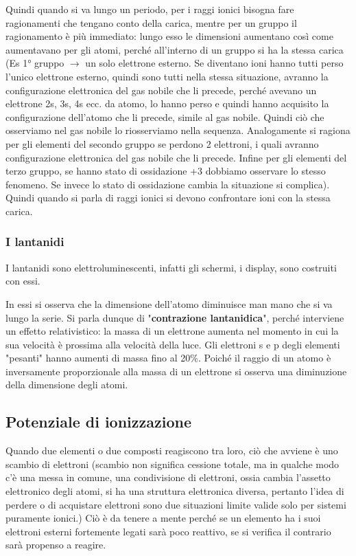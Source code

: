 
Quindi quando si va lungo un periodo, per i raggi ionici bisogna fare ragionamenti che tengano conto della carica, mentre per un gruppo il ragionamento è più immediato: lungo esso le dimensioni aumentano così come aumentavano per gli atomi, perché all'interno di un gruppo si ha la stessa carica (Es 1° gruppo $\rightarrow$ un solo elettrone esterno. Se diventano ioni hanno tutti perso l'unico elettrone esterno, quindi sono tutti nella stessa situazione, avranno la configurazione elettronica del gas nobile che li precede, perché avevano un elettrone 2s, 3s, 4s ecc. da atomo, lo hanno perso e quindi hanno acquisito la configurazione dell'atomo che li precede, simile al gas nobile. Quindi ciò che osserviamo nel gas nobile lo riosserviamo nella sequenza. Analogamente si ragiona per gli elementi del secondo gruppo se perdono 2 elettroni, i quali avranno configurazione elettronica del gas nobile che li precede. Infine per gli elementi del terzo gruppo, se hanno stato di ossidazione +3 dobbiamo osservare lo stesso fenomeno. Se invece lo stato di ossidazione cambia la situazione si complica). Quindi quando si parla di raggi ionici si devono confrontare ioni con la stessa carica.
\subsubsection{I lantanidi}
I lantanidi sono elettroluminescenti, infatti gli schermi, i display, sono costruiti con essi.

In essi si osserva che la dimensione dell'atomo diminuisce man mano che si va lungo la serie. Si parla dunque di "\textbf{contrazione lantanidica}", perché interviene un effetto relativistico: la massa di un elettrone aumenta nel momento in cui la sua velocità è prossima alla velocità della luce. Gli elettroni s e p degli elementi "pesanti" hanno aumenti di massa fino al 20\%. Poiché il raggio di un atomo è inversamente proporzionale alla massa di un elettrone si osserva una diminuzione della dimensione degli atomi.
\subsection{Potenziale di ionizzazione}
Quando due elementi o due composti reagiscono tra loro, ciò che avviene è uno scambio di elettroni (scambio non significa cessione totale, ma in qualche modo c'è una messa in comune, una condivisione di elettroni, ossia cambia l'assetto elettronico degli atomi, si ha una struttura elettronica diversa, pertanto l'idea di perdere o di acquistare elettroni sono due situazioni limite valide solo per sistemi puramente ionici.) Ciò è da tenere a mente perché se un elemento ha i suoi elettroni esterni fortemente legati sarà poco reattivo, se si verifica il contrario sarà propenso a reagire.

